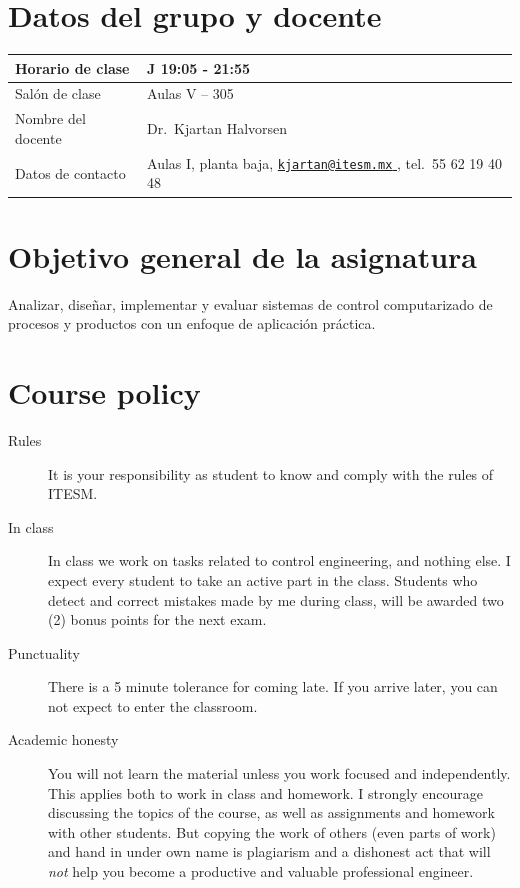 \documentclass[letter, 10pt]{scrartcl}
\begin{document}
\section*{Datos del grupo y docente}
\begin{tabularx}{\linewidth}{|L|X|}
\hline
Horario de clase & J 19:05 - 21:55\\\hline
Salón de clase & Aulas V -- 305\\\hline
Nombre del docente & Dr.~Kjartan Halvorsen\\\hline
Datos de contacto & Aulas I, planta baja, \href{mailto:kjartan@itesm.mx}{\nolinkurl{kjartan@itesm.mx} }, tel.~55 62 19 40 48\\\hline
\end{tabularx}

\section*{Objetivo general de la asignatura}
Analizar, diseñar, implementar y evaluar sistemas de control computarizado de procesos y productos con un enfoque de aplicación práctica.

\section*{Course policy}
\begin{description}
\item[Rules] It is your responsibility as student to know and comply with the rules of ITESM.
\item[In class] In class we work on tasks related to control engineering, and nothing else. I expect every student to take an active part in the class. Students who detect and correct mistakes made by me during class, will be awarded two (2) bonus points for the next exam.  
\item[Punctuality] There is a 5 minute tolerance for coming late. If you arrive later, you can not expect to enter the classroom.
\item[Academic honesty] You will not learn the material unless you work focused and independently. This applies both to work in class and homework. I strongly encourage discussing the topics of the course,  as well as assignments and homework with other students. But copying the work of others (even parts of work) and hand in under own name is plagiarism and a dishonest act that will \emph{not} help you become a productive and valuable professional engineer. 
\end{description}
\end{document}
